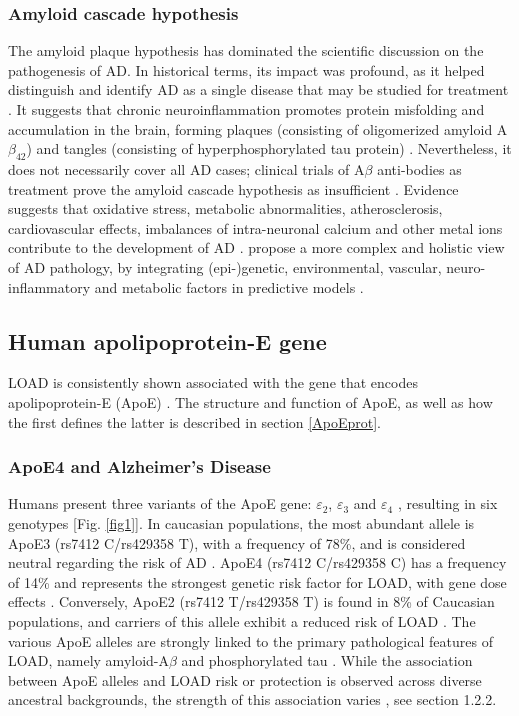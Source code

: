 \documentclass{amsart}
\theoremstyle{plain}
\begin{document}
\subsubsection{Amyloid cascade hypothesis}
The amyloid plaque hypothesis has dominated the scientific discussion on the pathogenesis of AD. In historical terms, its impact was profound, as it helped distinguish and identify AD as a single disease that may be studied for treatment \cite{Hardy2006AlzheimersReappraisal}. It suggests that chronic neuroinflammation promotes protein misfolding and accumulation in the brain, forming plaques (consisting of oligomerized amyloid A$\beta_{42}$) and tangles (consisting of hyperphosphorylated tau protein) \cite{Edwards2019ANeurodegeneration}. Nevertheless, it does not necessarily cover all AD cases; clinical trials of A$\beta$ anti-bodies as treatment prove the amyloid cascade hypothesis as insufficient \cite{Kepp2023TheReview,Kurkinen2023TheThinking}. Evidence suggests that oxidative stress, metabolic abnormalities, atherosclerosis, cardiovascular effects, imbalances of intra-neuronal calcium and other metal ions contribute to the development of AD \cite{Kepp2023TheReview}. \citeauthor{Kepp2023TheReview} propose a more complex and holistic view of AD pathology, by integrating (epi-)genetic, environmental, vascular, neuro-inflammatory and metabolic factors in predictive models \cite{Kepp2023TheReview}.

\subsection{Human apolipoprotein-E gene}
LOAD is consistently shown associated with the gene that encodes apolipoprotein-E (ApoE) \cite{Corder1993GeneFamilies}. The structure and function of ApoE, as well as how the first defines the latter is described in section \ref{ApoEprot}.

\subsubsection{ApoE4 and Alzheimer's Disease}
Humans present three variants of the ApoE gene: $\varepsilon_2$, $\varepsilon_3$ and $\varepsilon_4$ \cite{Husain2021APOETherapeutics, Yang2023ApolipoproteinDisease}, resulting in six genotypes [Fig. \ref{fig1}]. In caucasian populations, the most abundant allele is ApoE3 (rs7412 C/rs429358 T), with a frequency of 78\%, and is considered neutral regarding the risk of AD \cite{Liu2013ApolipoproteinTherapy}. ApoE4 (rs7412 C/rs429358 C) has a frequency of 14\% and represents the strongest genetic risk factor for LOAD, with gene dose effects \cite{Strittmatter1993ApolipoproteinDisease}. Conversely, ApoE2 (rs7412 T/rs429358 T) is found in 8\% of Caucasian populations, and carriers of this allele exhibit a reduced risk of LOAD \cite{Liu2013ApolipoproteinTherapy}. The various ApoE alleles are strongly linked to the primary pathological features of LOAD, namely amyloid-A$\beta$ and phosphorylated tau \cite{Deming2017Genome-wideModifiers}. While the association between ApoE alleles and LOAD risk or protection is observed across diverse ancestral backgrounds, the strength of this association varies \cite{Belloy2019AForward, Farrer1997EffectsMeta-analysis}, see section 1.2.2.
\end{document}
